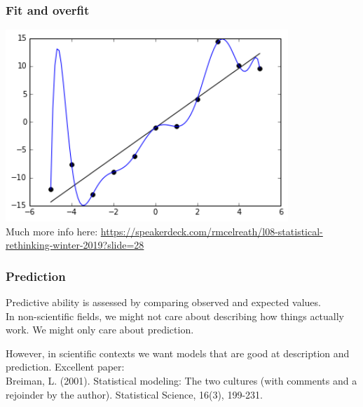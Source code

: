 \documentclass[color=usenames,dvipsnames]{beamer}\usepackage[]{graphicx}\usepackage[]{color}
\begin{document}
\begin{frame}
  \frametitle{Fit and overfit}
  \centering
  \includegraphics[width=0.8\textwidth]{Overfitted_data}   \\
  \pause
  \vfill
  Much more info here: \url{https://speakerdeck.com/rmcelreath/l08-statistical-rethinking-winter-2019?slide=28}  
\end{frame}



\begin{frame}
  \frametitle{Prediction}
  \large
  Predictive ability is assessed by comparing observed and expected
  values. \\ 
  \pause
  \vfill
  In non-scientific fields, we might not care about describing how
  things actually work. We might only care about prediction. \par
  \pause
  \vfill
  However, in scientific contexts we want models that are good at
  description and prediction.
  \pause
  \vfill
  Excellent paper: \\
  \normalsize
  Breiman, L. (2001). Statistical modeling: The two cultures (with
  comments and a rejoinder by the author). Statistical Science, 16(3),
  199-231. \\
\end{frame}
\end{document}
